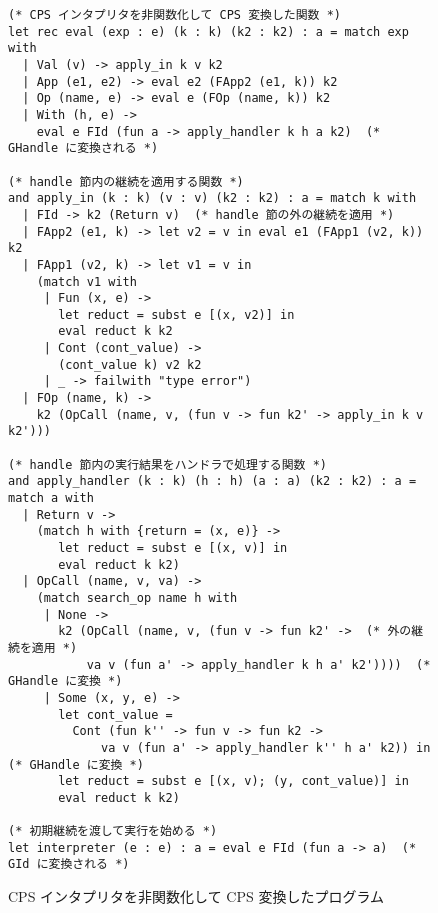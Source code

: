
\begin{figure}
\begin{verbatim}
(* CPS インタプリタを非関数化して CPS 変換した関数 *)
let rec eval (exp : e) (k : k) (k2 : k2) : a = match exp with
  | Val (v) -> apply_in k v k2
  | App (e1, e2) -> eval e2 (FApp2 (e1, k)) k2
  | Op (name, e) -> eval e (FOp (name, k)) k2
  | With (h, e) ->
    eval e FId (fun a -> apply_handler k h a k2)  (* GHandle に変換される *)

(* handle 節内の継続を適用する関数 *)
and apply_in (k : k) (v : v) (k2 : k2) : a = match k with
  | FId -> k2 (Return v)  (* handle 節の外の継続を適用 *)
  | FApp2 (e1, k) -> let v2 = v in eval e1 (FApp1 (v2, k)) k2
  | FApp1 (v2, k) -> let v1 = v in
    (match v1 with
     | Fun (x, e) ->
       let reduct = subst e [(x, v2)] in
       eval reduct k k2
     | Cont (cont_value) ->
       (cont_value k) v2 k2
     | _ -> failwith "type error")
  | FOp (name, k) ->
    k2 (OpCall (name, v, (fun v -> fun k2' -> apply_in k v k2')))

(* handle 節内の実行結果をハンドラで処理する関数 *)
and apply_handler (k : k) (h : h) (a : a) (k2 : k2) : a = match a with
  | Return v ->
    (match h with {return = (x, e)} ->
       let reduct = subst e [(x, v)] in
       eval reduct k k2)
  | OpCall (name, v, va) ->
    (match search_op name h with
     | None ->
       k2 (OpCall (name, v, (fun v -> fun k2' ->  (* 外の継続を適用 *)
           va v (fun a' -> apply_handler k h a' k2'))))  (* GHandle に変換 *)
     | Some (x, y, e) ->
       let cont_value =
         Cont (fun k'' -> fun v -> fun k2 ->
             va v (fun a' -> apply_handler k'' h a' k2)) in  (* GHandle に変換 *)
       let reduct = subst e [(x, v); (y, cont_value)] in
       eval reduct k k2)

(* 初期継続を渡して実行を始める *)
let interpreter (e : e) : a = eval e FId (fun a -> a)  (* GId に変換される *)
\end{verbatim}
\caption{CPS インタプリタを非関数化して CPS 変換したプログラム}
\label{figure:3cps}
\end{figure}

